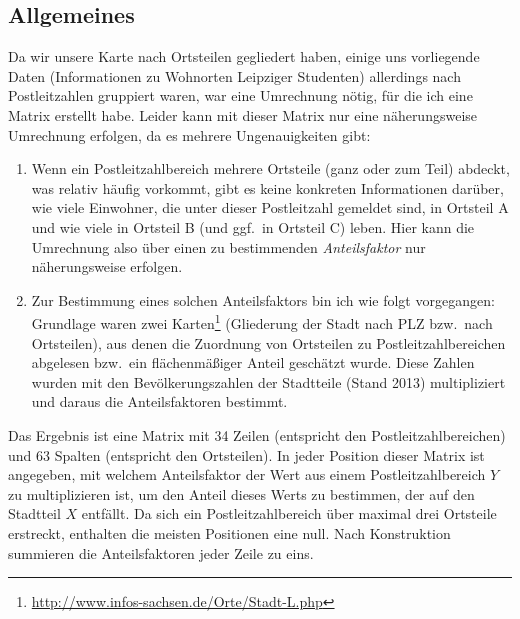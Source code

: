 \documentclass[a4paper,11pt]{article}
\begin{document}
\subsection  {Allgemeines}
Da wir unsere Karte nach Ortsteilen gegliedert haben, einige uns vorliegende
Daten (Informationen zu Wohnorten Leipziger Studenten) allerdings nach
Postleitzahlen gruppiert waren, war eine Umrechnung nötig, für die ich eine
Matrix erstellt habe. Leider kann mit dieser Matrix nur eine näherungsweise
Umrechnung erfolgen, da es mehrere Ungenauigkeiten gibt: 
\begin{enumerate}
\item Wenn ein Postleitzahlbereich mehrere Ortsteile (ganz oder zum Teil)
  abdeckt, was relativ häufig vorkommt, gibt es keine konkreten Informationen
  darüber, wie viele Einwohner, die unter dieser Postleitzahl gemeldet sind, in
  Ortsteil A und wie viele in Ortsteil B (und ggf.\ in Ortsteil C) leben.  Hier
  kann die Umrechnung also über einen zu bestimmenden \emph{Anteilsfaktor} nur
  näherungsweise erfolgen.

\item Zur Bestimmung eines solchen Anteilsfaktors bin ich wie folgt
  vorgegangen: Grundlage waren zwei
  Karten\footnote{\url{http://www.infos-sachsen.de/Orte/Stadt-L.php}}
  (Gliederung der Stadt nach PLZ bzw.\ nach Ortsteilen), aus denen die
  Zuordnung von Ortsteilen zu Postleitzahlbereichen abgelesen bzw.\ ein
  flächenmäßiger Anteil geschätzt wurde.  Diese Zahlen wurden mit den
  Bevölkerungszahlen der Stadtteile (Stand 2013) multipliziert und daraus die
  Anteilsfaktoren bestimmt.
\end{enumerate}
Das Ergebnis ist eine Matrix mit 34 Zeilen (entspricht den
Postleitzahlbereichen) und 63 Spalten (entspricht den Ortsteilen). In jeder
Position dieser Matrix ist angegeben, mit welchem Anteilsfaktor der Wert aus
einem Postleitzahlbereich $Y$ zu multiplizieren ist, um den Anteil dieses Werts
zu bestimmen, der auf den Stadtteil $X$ entfällt. Da sich ein
Postleitzahlbereich über maximal drei Ortsteile erstreckt, enthalten die
meisten Positionen eine null.  Nach Konstruktion summieren die Anteilsfaktoren
jeder Zeile zu eins.
\end{document}
